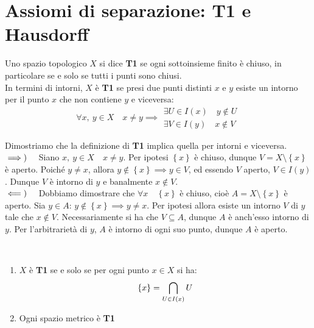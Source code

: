 \section{Assiomi di separazione: T1 e Hausdorff}
\begin{define}
Uno spazio topologico $X$ si dice \textbf{T1} se ogni sottoinsieme finito è chiuso, in particolare se e solo se tutti i punti sono chiusi.\\
In termini di intorni, $X$ è \textbf{T1} se presi due punti distinti $x$ e $y$ esiste un intorno per il punto $x$ che non contiene $y$ e viceversa:
\begin{equation}
\forall x,\ y\in X\quad x\neq y\implies
\begin{array}{l}
	\exists U\in I\left(x\right)\quad y\notin U\\
	\exists V\in I\left(y\right)\quad x\notin V
\end{array}
\end{equation}
\end{define}
\begin{demonstration} Dimostriamo che la definizione di \textbf{T1} implica quella per intorni e viceversa.\\
$\implies)\quad$ Siano $x,\ y\in X\quad x\neq y$. Per ipotesi $\left\{x\right\}$ è chiuso, dunque $V=X\setminus\left\{x\right\}$ è aperto. Poiché $y\neq x$, allora $y\notin\left\{x\right\}\implies y\in V$, ed essendo $V$ aperto, $V\in I\left(y\right)$. Dunque $V$ è intorno di $y$ e banalmente $x\notin V$.\\
$\impliedby)\quad$ Dobbiamo dimostrare che $\forall x\quad \left\{x\right\}$ è chiuso, cioè $A=X\setminus\left\{x\right\}$ è aperto. Sia $y\in A$: $y\notin \left\{x\right\}\implies y\neq x$. Per ipotesi allora esiste un intorno $V$ di $y$ tale che $x\notin V$. Necessariamente si ha che $V\subseteq A$, dunque $A$ è anch'esso intorno di $y$. Per l'arbitrarietà di $y$, $A$ è intorno di ogni suo punto, dunque $A$ è aperto.
\end{demonstration}
\begin{observe}~{}
\begin{enumerate}
\item $X$ è \textbf{T1} se e solo se per ogni punto $x\in X$ si ha:
\begin{equation}
\left\{x\right\}=\mathop{{\bigcap}}\displaylimits_{U\in I\left(x\right)}U
\end{equation}
\item Ogni spazio metrico è \textbf{T1}
\end{enumerate}
\end{observe}
